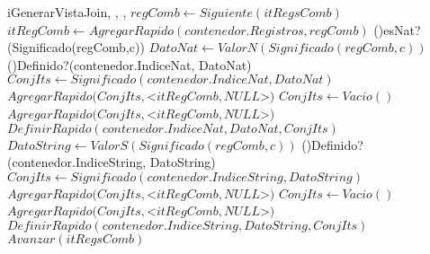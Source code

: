 \begin{Algoritmos}
\begin{algoritmo}{iGenerarVistaJoin}{, , , }{}
{		$regComb \gets Siguiente(itRegsComb) $  
        $itRegComb \gets AgregarRapido(contenedor.Registros, regComb) $  
    	\eIf(){esNat?(Significado(regComb,c))}{
        	$DatoNat \gets ValorN(Significado(regComb, c))$  
            \eIf(){Definido?(contenedor.IndiceNat, DatoNat)}{
            	$ConjIts \gets Significado(contenedor.IndiceNat, DatoNat) $ 
                $AgregarRapido(ConjIts, $<$itRegComb,NULL$>$) $ 
            }{
            	$ConjIts \gets Vacio() $ 
				$AgregarRapido(ConjIts, $<$itRegComb,NULL$>$) $ 
				$DefinirRapido(contenedor.IndiceNat, DatoNat, ConjIts) $              	
            }
        }
        {
        	$DatoString \gets ValorS(Significado(regComb, c))$  
            \eIf(){Definido?(contenedor.IndiceString, DatoString)}{
            	$ConjIts \gets Significado(contenedor.IndiceString, DatoString) $ 
                $AgregarRapido(ConjIts, $<$itRegComb,NULL$>$) $ 
            }{
            	$ConjIts \gets Vacio() $ 
				$AgregarRapido(ConjIts, $<$itRegComb,NULL$>$) $ 
				$DefinirRapido(contenedor.IndiceString, DatoString, ConjIts) $              	
            }
		}
        $Avanzar(itRegsComb)$ 
    }
\end{algoritmo}


\end{Algoritmos}

